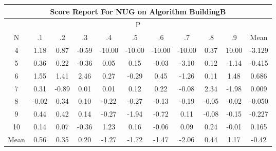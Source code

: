 \documentclass[11pt,a4paper]{report}
\begin{document}
\begin{longtable}{ | c || c | c | c | c | c | c | c | c | c || c |}
\hline
\multicolumn{11}{|c|}{ Score Report For NUG on Algorithm BuildingB} \\
\hline
\multicolumn{11}{|c|}{ P } \\
\hline
N & .1 & .2 & .3 & .4 & .5 & .6 & .7 & .8 & .9 & Mean\\
 \hline
 \hline
 \endhead
  4 &  \cellcolor[HTML]{DFDFFF} 1.18 &  \cellcolor[HTML]{E7E7FF} 0.87 &  \cellcolor[HTML]{FFEFEF} -0.59 &  \cellcolor[HTML]{FF0000} -10.00 &  \cellcolor[HTML]{FF0000} -10.00 &  \cellcolor[HTML]{FF0000} -10.00 &  \cellcolor[HTML]{FF0000} -10.00 &  \cellcolor[HTML]{F7F7FF} 0.37 &  \cellcolor[HTML]{0808FF} 10.00 & -3.129 \\
  5 &  \cellcolor[HTML]{F7F7FF} 0.36 &  \cellcolor[HTML]{F7F7FF} 0.22 &  \cellcolor[HTML]{FFF7F7} -0.36 &  \cellcolor[HTML]{FFFFFF} 0.05 &  \cellcolor[HTML]{FFFFFF} 0.15 &  \cellcolor[HTML]{FFFFFF} -0.03 &  \cellcolor[HTML]{FFAFAF} -3.10 &  \cellcolor[HTML]{FFFFFF} 0.12 &  \cellcolor[HTML]{FFDFDF} -1.14 & -0.415 \\
  6 &  \cellcolor[HTML]{D7D7FF} 1.55 &  \cellcolor[HTML]{DFDFFF} 1.41 &  \cellcolor[HTML]{BFBFFF} 2.46 &  \cellcolor[HTML]{F7F7FF} 0.27 &  \cellcolor[HTML]{FFF7F7} -0.29 &  \cellcolor[HTML]{F7F7FF} 0.45 &  \cellcolor[HTML]{FFDFDF} -1.26 &  \cellcolor[HTML]{FFFFFF} 0.11 &  \cellcolor[HTML]{D7D7FF} 1.48 & 0.686 \\
  7 &  \cellcolor[HTML]{F7F7FF} 0.31 &  \cellcolor[HTML]{FFE7E7} -0.89 &  \cellcolor[HTML]{FFFFFF} 0.01 &  \cellcolor[HTML]{FFFFFF} 0.01 &  \cellcolor[HTML]{FFFFFF} 0.12 &  \cellcolor[HTML]{F7F7FF} 0.22 &  \cellcolor[HTML]{FFFFFF} -0.08 &  \cellcolor[HTML]{C7C7FF} 2.34 &  \cellcolor[HTML]{FFCFCF} -1.98 & 0.009 \\
  8 &  \cellcolor[HTML]{FFFFFF} -0.02 &  \cellcolor[HTML]{F7F7FF} 0.34 &  \cellcolor[HTML]{FFFFFF} 0.10 &  \cellcolor[HTML]{FFF7F7} -0.22 &  \cellcolor[HTML]{FFF7F7} -0.27 &  \cellcolor[HTML]{FFFFFF} -0.13 &  \cellcolor[HTML]{FFF7F7} -0.19 &  \cellcolor[HTML]{FFFFFF} -0.05 &  \cellcolor[HTML]{FFFFFF} -0.02 & -0.050 \\
  9 &  \cellcolor[HTML]{F7F7FF} 0.44 &  \cellcolor[HTML]{F7F7FF} 0.42 &  \cellcolor[HTML]{FFFFFF} 0.14 &  \cellcolor[HTML]{FFF7F7} -0.27 &  \cellcolor[HTML]{FFCFCF} -1.94 &  \cellcolor[HTML]{FFEFEF} -0.72 &  \cellcolor[HTML]{FFFFFF} 0.11 &  \cellcolor[HTML]{FFFFFF} -0.08 &  \cellcolor[HTML]{FFFFFF} -0.15 & -0.227 \\
  10 &  \cellcolor[HTML]{FFFFFF} 0.14 &  \cellcolor[HTML]{FFFFFF} 0.07 &  \cellcolor[HTML]{FFF7F7} -0.36 &  \cellcolor[HTML]{DFDFFF} 1.23 &  \cellcolor[HTML]{F7F7FF} 0.16 &  \cellcolor[HTML]{FFFFFF} -0.06 &  \cellcolor[HTML]{FFFFFF} 0.09 &  \cellcolor[HTML]{F7F7FF} 0.24 &  \cellcolor[HTML]{FFFFFF} -0.01 & 0.165 \\
 \hline
 \hline
Mean &  \cellcolor[HTML]{EFEFFF} 0.56 &  \cellcolor[HTML]{F7F7FF} 0.35 &  \cellcolor[HTML]{F7F7FF} 0.20 &  \cellcolor[HTML]{FFDFDF} -1.27 &  \cellcolor[HTML]{FFD7D7} -1.72 &  \cellcolor[HTML]{FFD7D7} -1.47 &  \cellcolor[HTML]{FFCFCF} -2.06 &  \cellcolor[HTML]{F7F7FF} 0.44 &  \cellcolor[HTML]{DFDFFF} 1.17 &  \cellcolor[HTML]{FFF7F7} -0.42
\end{longtable}
\end{document}
